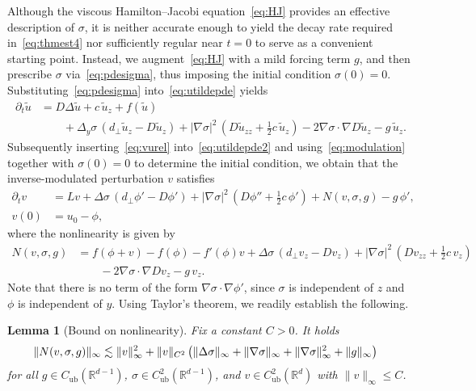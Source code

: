 \documentclass[12pt,oneside,a4paper,reqno]{amsart}
\numberwithin{equation}{section}
\newtheorem{lemma}[theorem]{Lemma}
\theoremstyle{definition}
\theoremstyle{remark}
\newcommand{\bbR}{{\mathbb R}}
\DeclarePairedDelimiter{\norm}{\lVert}{\rVert}
\DeclarePairedDelimiter{\bra}{(}{)}
\begin{document}
Although the viscous Hamilton--Jacobi equation~\eqref{eq:HJ} provides an effective description of $\sigma$, it is neither accurate enough to yield the decay rate required in~\eqref{eq:thmest4} nor sufficiently regular near $t=0$ to serve as a convenient starting point. Instead, we augment~\eqref{eq:HJ} with a mild forcing term $g$, and then prescribe $\sigma$ via~\eqref{eq:pdesigma}, thus imposing the initial condition $\sigma(0) = 0$. Substituting~\eqref{eq:pdesigma} into~\eqref{eq:utildepde} yields
\begin{equation}
\label{eq:utildepde2}
\begin{aligned}
\partial_t\tilde{u} &= D\Delta \tilde{u} + c\,\tilde{u}_z + f(\tilde{u}) \\
&\qquad + \Delta_y \sigma\,(d_{\bot}\tilde{u}_z - D\tilde{u}_z)
    + |\nabla \sigma|^2\,(D\tilde{u}_{zz} + \tfrac{1}{2}c\,\tilde{u}_z)
    - 2\nabla \sigma \cdot \nabla D\tilde{u}_z
    - g\,\tilde{u}_z.
\end{aligned}
\end{equation}
Subsequently inserting~\eqref{eq:vurel} into~\eqref{eq:utildepde2} and using~\eqref{eq:modulation} together with $\sigma(0)=0$ to determine the initial condition, we obtain that the inverse-modulated perturbation $v$ satisfies
\begin{equation}
\begin{aligned}
    \label{eq:pdev}
	\partial_t v &= L v
    + \Delta \sigma \, (d_{\bot}\phi' - D\phi')
    + |\nabla \sigma|^2 \, (D\phi'' + \tfrac12 c \, \phi')
    + N(v,\sigma,g) - g\, \phi', \\
    v(0) &= u_0 - \phi,
\end{aligned}
\end{equation}
where the nonlinearity is given by
\begin{equation}
    \label{eq:defN}
\begin{aligned}
	N(v,\sigma,g) &= f(\phi+v) - f(\phi) - f'(\phi)v
        + \Delta \sigma\, (d_{\bot}v_z - Dv_z)
        + |\nabla \sigma|^2\,(D v_{zz} + \tfrac12 c \,v_z) \\
	&\qquad - 2\nabla \sigma \cdot \nabla D v_z
        - g \, v_z.
\end{aligned}
\end{equation}
Note that there is no term of the form $\nabla \sigma \cdot \nabla \phi'$, since $\sigma$ is independent of $z$ and $\phi$ is independent of $y$. Using Taylor's theorem, we readily establish the following.

\begin{lemma}[Bound on nonlinearity]
	\label{lem:Nestimate1}
    Fix a constant $C > 0$. It holds
	\begin{align}
        \label{eq:Nest1}
		\norm{N(v,\sigma,g)}_{\infty} &\lesssim \norm{v}_{\infty}^2 + \norm{v}_{C^2} \, \bra[\big]{\norm{\Delta \sigma}_{\infty} + \norm{\nabla \sigma}_{\infty} + \norm{\nabla \sigma}_{\infty}^2 + \norm{g}_{\infty}}
	\end{align}
    for all $g \in C_{\mathrm{ub}}(\bbR^{d-1})$, $\sigma \in C_{\mathrm{ub}}^2(\bbR^{d-1})$, and $v \in C_{\mathrm{ub}}^2(\bbR^d)$ with $\|v\|_\infty \leq C$.
\end{lemma}
\end{document}
